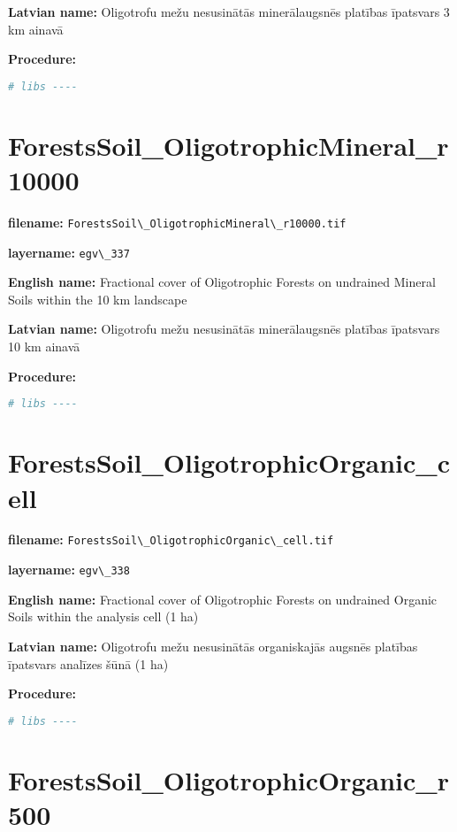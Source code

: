 \documentclass[
]{book}
\newcommand{\passthrough}[1]{#1}
\begin{document}
\textbf{Latvian name:} Oligotrofu mežu nesusinātās minerālaugsnēs platības īpatsvars 3 km ainavā

\textbf{Procedure:}

\begin{lstlisting}[language=R]
# libs ----
\end{lstlisting}

\section{ForestsSoil\_OligotrophicMineral\_r10000}\label{ch06.337}

\textbf{filename:} \passthrough{\lstinline!ForestsSoil\_OligotrophicMineral\_r10000.tif!}

\textbf{layername:} \passthrough{\lstinline!egv\_337!}

\textbf{English name:} Fractional cover of Oligotrophic Forests on undrained Mineral Soils within the 10 km landscape

\textbf{Latvian name:} Oligotrofu mežu nesusinātās minerālaugsnēs platības īpatsvars 10 km ainavā

\textbf{Procedure:}

\begin{lstlisting}[language=R]
# libs ----
\end{lstlisting}

\section{ForestsSoil\_OligotrophicOrganic\_cell}\label{ch06.338}

\textbf{filename:} \passthrough{\lstinline!ForestsSoil\_OligotrophicOrganic\_cell.tif!}

\textbf{layername:} \passthrough{\lstinline!egv\_338!}

\textbf{English name:} Fractional cover of Oligotrophic Forests on undrained Organic Soils within the analysis cell (1 ha)

\textbf{Latvian name:} Oligotrofu mežu nesusinātās organiskajās augsnēs platības īpatsvars analīzes šūnā (1 ha)

\textbf{Procedure:}

\begin{lstlisting}[language=R]
# libs ----
\end{lstlisting}

\section{ForestsSoil\_OligotrophicOrganic\_r500}\label{ch06.339}
\end{document}
